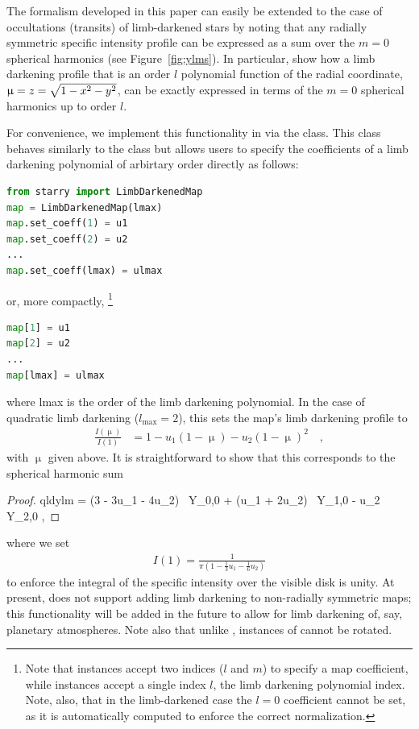 \documentclass[modern]{aastex61}
\begin{document}
The formalism developed in this paper can easily be extended to the case
of occultations (transits) of limb-darkened stars by noting that any
radially symmetric specific intensity profile can be expressed as a sum
over the $m = 0$ spherical harmonics (see Figure~\ref{fig:ylms}).
%
In particular, \citet{limbdark} show how a limb darkening profile
that is an order $l$ polynomial function of the radial coordinate,
$\upmu = \mbox{$z$} = \sqrt{1 - \mbox{$x$}^2 - \mbox{$y$}^2}$, can be exactly
expressed in terms of the $m = 0$ spherical harmonics up to order $l$.

For convenience, we implement this functionality in \starry via the
\starryLimbDarkenedMap class. This class behaves similarly
to the \starryMap class but allows users
to specify the coefficients of a limb darkening polynomial of arbirtary order
directly as follows:
%
\begin{lstlisting}[language=Python,firstnumber=last]
from starry import LimbDarkenedMap
map = LimbDarkenedMap(lmax)
map.set_coeff(1) = u1
map.set_coeff(2) = u2
...
map.set_coeff(lmax) = ulmax
\end{lstlisting}
%
or, more compactly,
\footnote{Note that \starryMap instances accept two indices
($l$ and $m$) to specify a map coefficient, while
\starryLimbDarkenedMap instances accept a single index $l$,
the limb darkening polynomial index. Note, also, that in the limb-darkened
case the $l = 0$ coefficient cannot be set, as it is automatically computed to
enforce the correct normalization.}
%
\begin{lstlisting}[language=Python,firstnumber=last]
map[1] = u1
map[2] = u2
...
map[lmax] = ulmax
\end{lstlisting}
%
where \textsf{lmax} is the order of the limb darkening polynomial.
In the case of quadratic limb darkening ($l_\mathrm{max} = 2$),
this sets the map's limb darkening profile to
%
\begin{align}
    \label{eq:quadraticld}
    \frac{I(\upmu)}{I(1)} &= 1 - u_1 (1 - \upmu) - u_2 (1 - \upmu)^2
    \quad,
\end{align}
%
with $\upmu$ given above.
It is straightforward to show that this corresponds to the spherical harmonic sum
%
\begin{proof}{qldylm}
    \label{eq:qldylm}
     =
             (3 - 3u_1 - 4u_2) \, Y_{0,0}
          +  (u_1 + 2u_2) \, Y_{1,0}
          -  u_2 \, Y_{2,0}
      \quad,
\end{proof}
%
where we set
%
\begin{align}
    \label{eq:I1}
    I(1) = \frac{1}{\pi(1 - \frac{1}{3}u_1 - \frac{1}{6}u_2)}
\end{align}
%
to enforce the integral of the specific intensity over the visible disk
is unity.
At present, \starry does not support
adding limb darkening to non-radially symmetric maps; this
functionality will be added in the future to allow for limb darkening
of, say, planetary atmospheres. Note also that unlike \starryMap,
instances of \starryLimbDarkenedMap cannot be rotated.
\end{document}
